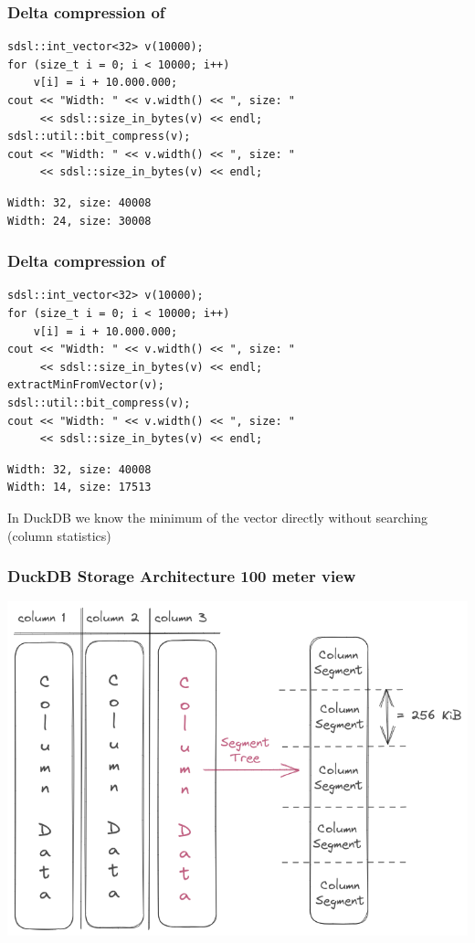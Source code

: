 \documentclass{beamer}
\begin{document}
\begin{frame}[fragile]
    \frametitle{Delta compression of }

\begin{lstlisting}[style=C++]
sdsl::int_vector<32> v(10000);
for (size_t i = 0; i < 10000; i++) 
    v[i] = i + 10.000.000;
cout << "Width: " << v.width() << ", size: " 
     << sdsl::size_in_bytes(v) << endl;
sdsl::util::bit_compress(v);
cout << "Width: " << v.width() << ", size: " 
     << sdsl::size_in_bytes(v) << endl;
\end{lstlisting}

\begin{lstlisting}[style=shell]
Width: 32, size: 40008
Width: 24, size: 30008
\end{lstlisting}
\end{frame}


\begin{frame}[fragile]
    \frametitle{Delta compression of }
\begin{lstlisting}[style=C++]
sdsl::int_vector<32> v(10000);
for (size_t i = 0; i < 10000; i++) 
    v[i] = i + 10.000.000;
cout << "Width: " << v.width() << ", size: " 
     << sdsl::size_in_bytes(v) << endl;
extractMinFromVector(v);
sdsl::util::bit_compress(v);
cout << "Width: " << v.width() << ", size: " 
     << sdsl::size_in_bytes(v) << endl;
\end{lstlisting}

\begin{lstlisting}[style=shell]
Width: 32, size: 40008
Width: 14, size: 17513
\end{lstlisting}

\pause
In DuckDB we know the minimum of the vector directly without searching (column statistics)
\end{frame}


\begin{frame}
    \frametitle{DuckDB Storage Architecture 100 meter view}
    \includegraphics[width=\framewidth]{figures/excalidraw/duckdb-high-level-storage-arch.png}
\end{frame}
\end{document}
